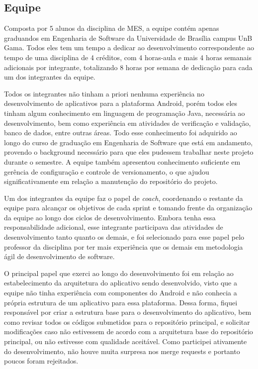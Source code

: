 \subsection{Equipe}
Composta por 5 alunos da disciplina de MES, a equipe contém apenas graduandos em Engenharia de Software da Universidade de Brasília campus UnB Gama. Todos eles tem um tempo a dedicar ao desenvolvimento correspondente ao tempo de uma disciplina de 4 créditos, com 4 horas-aula e mais 4 horas semanais adicionais por integrante, totalizando 8 horas por semana de dedicação para cada um dos integrantes da equipe.

Todos os integrantes não tinham a priori nenhuma experiência no desenvolvimento de aplicativos para a plataforma Android, porém todos eles tinham algum conhecimento em linguagem de programação Java, necessária ao desenvolvimento, bem como experiência em atividades de verificação e validação, banco de dados, entre outras áreas. Todo esse conhecimento foi adquirido ao longo do curso de graduação em Engenharia de Software que está em andamento, provendo o background necessário para que eles pudessem trabalhar neste projeto durante o semestre. A equipe também apresentou conhecimento suficiente em gerência de configuração e controle de versionamento, o que ajudou significativamente em relação a manutenção do repositório do projeto.

Um dos integrantes da equipe faz o papel de \textit{coach}, coordenando o restante da equipe para alcançar os objetivos de cada sprint e tomando frente da organização da equipe ao longo dos ciclos de desenvolvimento. Embora tenha essa responsabilidade adicional, esse integrante participava das atividades de desenvolvimento tanto quanto os demais, e foi selecionado para esse papel pelo professor da disciplina por ter mais experiência que os demais em metodologia ágil de desenvolvimento de software.

O principal papel que exerci ao longo do desenvolvimento foi em relação ao estabelecimento da arquitetura do aplicativo sendo desenvolvido, visto que a equipe não tinha experiência com componentes do Android e não conhecia a própria estrutura de um aplicativo para essa plataforma. Dessa forma, fiquei responsável por criar a estrutura base para o desenvolvimento do aplicativo, bem como revisar todos os códigos submetidos para o repositório principal, e solicitar modificações caso não estivessem de acordo com a arquitetura base do repositório principal, ou não estivesse com qualidade aceitável. Como participei ativamente do desenvolvimento, não houve muita surpresa nos merge requests e portanto poucos foram rejeitados.

